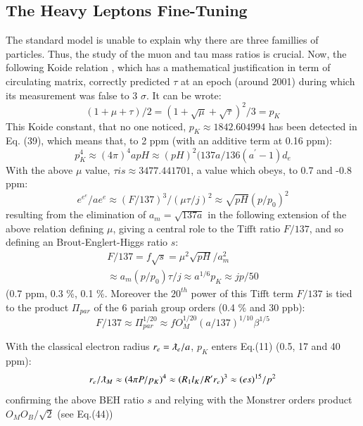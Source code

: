 \documentclass[twoside,draft]{article}
\begin{document}
\begin{sloppypar}
\subsection {The Heavy Leptons Fine-Tuning}
The standard model is unable to explain why there are three famillies of particles. Thus, the study of the muon and tau mass ratios is crucial. Now, the following Koide relation \cite{Koide}, which has a mathematical justification in term of circulating matrix, correctly predicted $\tau$ at an epoch (around 2001) during which its measurement was false to 3 $\sigma$. It can be wrote:
\begin{equation}
(1 + \mu + \tau)/2 = (1 + \sqrt\mu + \sqrt\tau)^2/3 = p_K
\end{equation}
This Koide constant, that no one noticed, $p_K \approx 1842.604994$ has been detected in Eq. (39), which means that, to 2 ppm (with an additive term at 0.16 ppm):
\begin{equation}
p_K^4 \approx (4\pi)^4 apH \approx (pH)^2 (137a/136(a^{\prime}-1) d_e
\end{equation}
With the above $\mu$ value, $\tau is \approx 3477.441701$, a value which obeys, to 0.7 and -0.8 ppm:
\begin{equation}
e^{e^e}/a e^e \approx (F/137)^{3}/ (\mu\tau/j)^2 \approx  \sqrt{pH} (p/p_0)^2 
\end{equation}
resulting from the elimination of $a_m = \sqrt{137a}$ in the following extension of the above relation defining $\mu$, giving a central role to the Tifft ratio $F/137$, and so defining an Brout-Englert-Higgs ratio $s$:
$$
\begin{array}{ll}
%
\displaystyle
F/137 = f \sqrt{s} = \mu^2 \sqrt{pH}/a_m^2 \\ \approx a_m (p/p_0) \tau /j \approx a^{1/6}p_K \approx jp/50 
\end{array}
$$
(0.7 ppm, 0.3 \%, 0.1 \%. Moreover the $20^{th}$ power of this Tifft term $F/137$ is tied to the product $\Pi_{par}$ of the 6 pariah group orders (0.4 \% and 30 ppb):
$$ F/137 \approx \Pi_{par}^{1/20} \approx f O_M^{1/20}(a/137)^{1/10}\beta^{1/5}$$ 

 With the classical electron radius $r_e = \lambdabar_e/a$, $p_K$ enters Eq.(11) (0.5, 17 and 40 ppm):
\begin{equation}
r_{e}/\lambdabar_M \approx(4\pi P/p_K)^4 \approx (R_1l_K/R^{\prime}r_e)^3 \approx (es)^{15}/p^2  
\end{equation}
confirming the above BEH ratio $s$ and relying with the Monstrer orders product $O_MO_B/\sqrt{2}$ (see Eq.(44))


\end{sloppypar}
\end{document}
